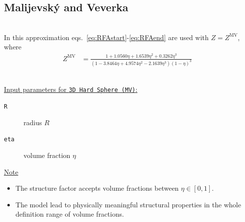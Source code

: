 \clearpage
\subsection{Malijevsk\'{y} and Veverka} \cite{Malijevsky1999} ~\\

\noindent In this approximation eqs.\ \ref{eq:RFAstart}-\ref{eq:RFAend} are used with $Z=Z^\mathrm{MV}$, where
\begin{align}
Z^\mathrm{MV} &= \frac{1 + 1.0560\eta + 1.6539\eta^2 + 0.3262\eta^3}{\left(1- 3.8464\eta + 4.9574\eta^2 -2.1639\eta^3\right)\left(1-\eta\right)^3}
\end{align}

\vspace{5mm}

\hspace{1pt}\\
\uline{Input parameters for \texttt{3D Hard Sphere (MV)}:}
\begin{description}
    \item[\texttt{R}]  radius $R$
    \item[\texttt{eta}] volume fraction $\eta$
\end{description}

\noindent
\uline{Note}
\begin{itemize}
\item The structure factor accepts volume fractions between $\eta \in [0,1]$.
\item The model lead to physically meaningful structural properties in the whole definition range of volume fractions.
\end{itemize}


